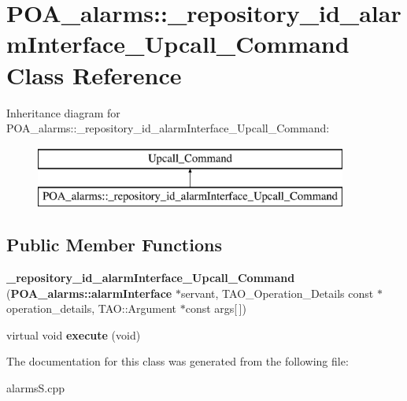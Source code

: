 \section{P\+O\+A\+\_\+alarms\+:\+:\+\_\+repository\+\_\+id\+\_\+alarm\+Interface\+\_\+\+Upcall\+\_\+\+Command Class Reference}
\label{classPOA__alarms_1_1__repository__id__alarmInterface__Upcall__Command}
Inheritance diagram for P\+O\+A\+\_\+alarms\+:\+:\+\_\+repository\+\_\+id\+\_\+alarm\+Interface\+\_\+\+Upcall\+\_\+\+Command\+:\begin{figure}[H]
\begin{center}
\leavevmode
\includegraphics[height=2.000000cm]{classPOA__alarms_1_1__repository__id__alarmInterface__Upcall__Command}
\end{center}
\end{figure}
\subsection*{Public Member Functions}
\begin{DoxyCompactItemize}
\item 
{\bfseries \+\_\+repository\+\_\+id\+\_\+alarm\+Interface\+\_\+\+Upcall\+\_\+\+Command} ({\bf P\+O\+A\+\_\+alarms\+::alarm\+Interface} $\ast$servant, T\+A\+O\+\_\+\+Operation\+\_\+\+Details const $\ast$operation\+\_\+details, T\+A\+O\+::\+Argument $\ast$const args[$\,$])\label{classPOA__alarms_1_1__repository__id__alarmInterface__Upcall__Command_ae795c3296108f8020cab92baaae3685c}

\item 
virtual void {\bfseries execute} (void)\label{classPOA__alarms_1_1__repository__id__alarmInterface__Upcall__Command_ac6fe71da54b307818514689dd0e082ef}

\end{DoxyCompactItemize}


The documentation for this class was generated from the following file\+:\begin{DoxyCompactItemize}
\item 
alarms\+S.\+cpp\end{DoxyCompactItemize}
